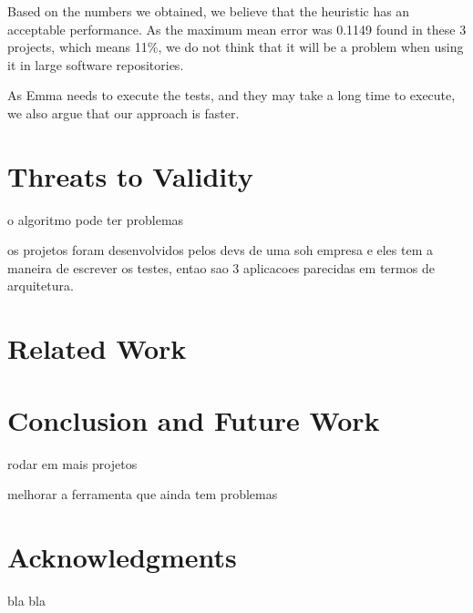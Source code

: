 \documentclass{sig-alternate}
\begin{document}
Based on the numbers we obtained, we believe that the heuristic has an acceptable performance. As the maximum mean error was 0.1149 found in these 3 projects, which means 11\%, 
we do not think that it will be a problem when using it in large software repositories.


As Emma needs to execute the tests, and they may take a long time to execute, we also argue
that our approach is faster.

\section{Threats to Validity}

o algoritmo pode ter problemas

os projetos foram desenvolvidos pelos devs de uma soh empresa e eles tem a maneira de escrever
os testes, entao sao 3 aplicacoes parecidas em termos de arquitetura.

\section{Related Work}











\section{Conclusion and Future Work}

rodar em mais projetos

melhorar a ferramenta que ainda tem problemas

\section{Acknowledgments}

bla bla



\end{document}
